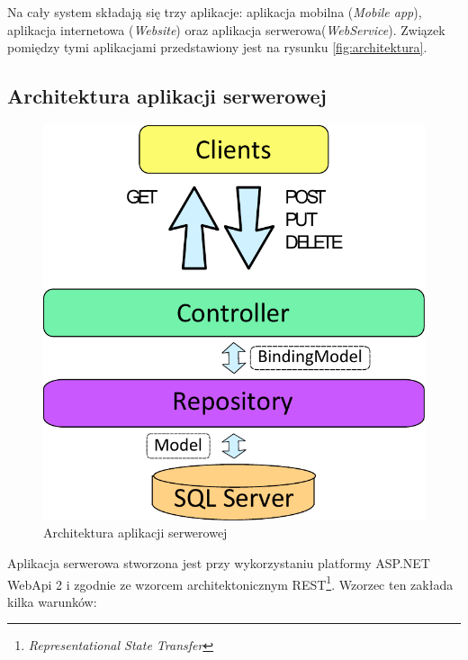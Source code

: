 \documentclass{book}
\begin{document}
		Na cały system składają się trzy aplikacje: aplikacja mobilna (\emph{Mobile app}), aplikacja internetowa (\emph{Website}) oraz aplikacja serwerowa(\emph{WebService}). Związek pomiędzy tymi aplikacjami przedstawiony jest na rysunku \ref{fig:architektura}. 
			
			\subsection{Architektura aplikacji serwerowej}
			
			\begin{figure}
				\centering
				\includegraphics[width=1\textwidth]{architektura_server.pdf}
				\caption{Architektura aplikacji serwerowej}
				\label{fig:architektura_server}
			\end{figure}
			
			Aplikacja serwerowa stworzona jest przy wykorzystaniu platformy ASP.NET WebApi 2 i zgodnie ze wzorcem architektonicznym REST\footnote{\emph{Representational State Transfer}}. Wzorzec ten zakłada kilka warunków:
			
\end{document}
